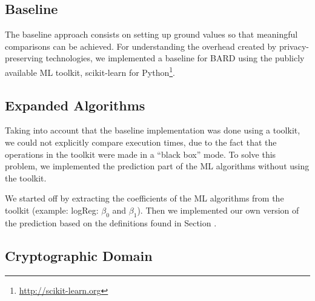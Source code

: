 \subsection{Baseline}
\label{subsec:BaselineImplementation}

The baseline approach consists on setting up ground values so that meaningful comparisons can be achieved. For understanding the overhead created by privacy-preserving technologies, we implemented a baseline for \ac{BARD} using the publicly available \ac{ML} toolkit, scikit-learn for Python\footnote{\url{http://scikit-learn.org}}.






\subsection{Expanded Algorithms}
\label{subsec:ExpandedAlgorithmsImplementation}

Taking into account that the baseline implementation was done using a toolkit, we could not explicitly compare execution times, due to the fact that the operations in the toolkit were made in a ``black box'' mode. To solve this problem, we implemented the prediction part of the \ac{ML} algorithms without using the toolkit.

We started off by extracting the coefficients of the \ac{ML} algorithms from the toolkit (example: logReg: $\beta_{0}$ and $\beta_{1}$). Then we implemented our own version of the prediction based on the definitions found in Section .







\subsection{Cryptographic Domain}
\label{subsec:CryptoDomainImplementation}



